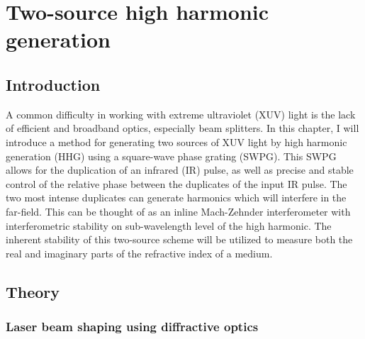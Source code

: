 \chapter{Two-source high harmonic generation}
\label{chap:two_source}

\section{Introduction}
\label{sec:intro_ts}

A common difficulty in working with extreme ultraviolet (XUV) light is the lack of efficient and broadband optics, especially beam splitters. In this chapter, I will introduce a method for generating two sources of XUV light by high harmonic generation (HHG) using a square-wave phase grating (SWPG).  This SWPG allows for the duplication of an infrared (IR) pulse, as well as precise and stable control of the relative phase between the duplicates of the input IR pulse. The two most intense duplicates can generate harmonics which will interfere in the far-field. This can be thought of as an inline Mach-Zehnder interferometer with interferometric stability on sub-wavelength level of the high harmonic. The inherent stability of this two-source scheme will be utilized to measure both the real and imaginary parts of the refractive index of a medium.

\section{Theory}
\subsection{Laser beam shaping using diffractive optics}
\label{sec:beam_shaping}

